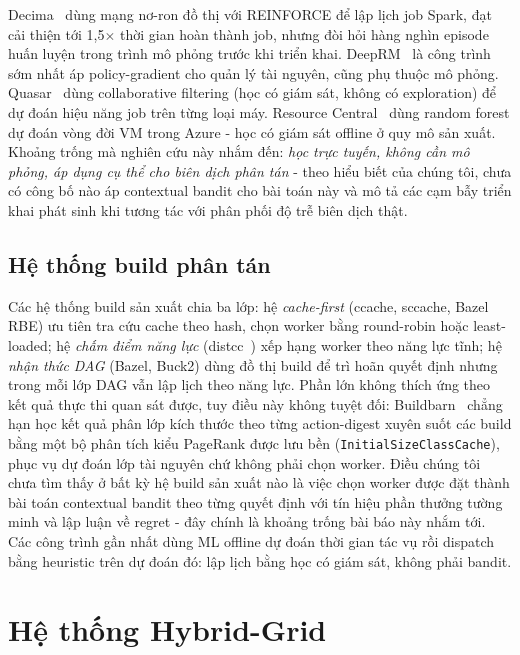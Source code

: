 \documentclass[final,5p,times,twocolumn]{elsarticle}
\begin{document}
Decima~\cite{decima} dùng mạng nơ-ron đồ thị với REINFORCE để lập lịch job Spark, đạt cải thiện tới 1,5$\times$ thời gian hoàn thành job, nhưng đòi hỏi hàng nghìn episode huấn luyện trong trình mô phỏng trước khi triển khai. DeepRM~\cite{deeprm} là công trình sớm nhất áp policy-gradient cho quản lý tài nguyên, cũng phụ thuộc mô phỏng. Quasar~\cite{quasar} dùng collaborative filtering (học có giám sát, không có exploration) để dự đoán hiệu năng job trên từng loại máy. Resource Central~\cite{resourcecentral} dùng random forest dự đoán vòng đời VM trong Azure - học có giám sát offline ở quy mô sản xuất. Khoảng trống mà nghiên cứu này nhắm đến: \emph{học trực tuyến, không cần mô phỏng, áp dụng cụ thể cho biên dịch phân tán} - theo hiểu biết của chúng tôi, chưa có công bố nào áp contextual bandit cho bài toán này và mô tả các cạm bẫy triển khai phát sinh khi tương tác với phân phối độ trễ biên dịch thật.

\subsection{Hệ thống build phân tán}

Các hệ thống build sản xuất chia ba lớp: hệ \emph{cache-first} (ccache, sccache, Bazel RBE) ưu tiên tra cứu cache theo hash, chọn worker bằng round-robin hoặc least-loaded; hệ \emph{chấm điểm năng lực} (distcc~\cite{distcc}) xếp hạng worker theo năng lực tĩnh; hệ \emph{nhận thức DAG} (Bazel, Buck2) dùng đồ thị build để trì hoãn quyết định nhưng trong mỗi lớp DAG vẫn lập lịch theo năng lực. Phần lớn không thích ứng theo kết quả thực thi quan sát được, tuy điều này không tuyệt đối: Buildbarn~\cite{buildbarn} chẳng hạn học kết quả phân lớp kích thước theo từng action-digest xuyên suốt các build bằng một bộ phân tích kiểu PageRank được lưu bền (\texttt{InitialSizeClassCache}), phục vụ dự đoán lớp tài nguyên chứ không phải chọn worker. Điều chúng tôi chưa tìm thấy ở bất kỳ hệ build sản xuất nào là việc chọn worker được đặt thành bài toán contextual bandit theo từng quyết định với tín hiệu phần thưởng tường minh và lập luận về regret - đây chính là khoảng trống bài báo này nhắm tới. Các công trình gần nhất dùng ML offline dự đoán thời gian tác vụ rồi dispatch bằng heuristic trên dự đoán đó: lập lịch bằng học có giám sát, không phải bandit.

\section{Hệ thống Hybrid-Grid}
\label{sec:system}
\end{document}
